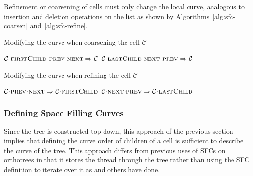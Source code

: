 \documentclass[twoside]{IIBproject}
\newcommand{\acc}{{\mkern 0.5mu\cdot\mkern 0.5mu}}
\numberwithin{figure}{section}
\begin{document}
            Refinement or coarsening of cells must only change the local curve, analogous to insertion and deletion operations on the list as shown by Algorithms~\ref{alg:sfc-coarsen} and~\ref{alg:sfc-refine}.

            \begin{algorithm}[H]
                \caption{Modifying the curve when coarsening the cell $\mathcal{C}$}
                \label{alg:sfc-coarsen}

                \begin{algorithmic}
                    \State $\mathcal{C}\acc\textproc{firstChild}\acc\textproc{prev}\acc\textproc{next} \Rightarrow \mathcal{C}$
                    \State $\mathcal{C}\acc\textproc{lastChild}\acc\textproc{next}\acc\textproc{prev} \Rightarrow \mathcal{C}$
                \end{algorithmic}
            \end{algorithm}

            \begin{algorithm}[H]
                \caption{Modifying the curve when refining the cell $\mathcal{C}$}
                \label{alg:sfc-refine}

                \begin{algorithmic}
                    \Statex
                    \State $\mathcal{C}\acc\textproc{prev}\acc\textproc{next} \Rightarrow \mathcal{C}\acc\textproc{firstChild}$
                    \State $\mathcal{C}\acc\textproc{next}\acc\textproc{prev} \Rightarrow \mathcal{C}\acc\textproc{lastChild}$
                \end{algorithmic}
            \end{algorithm}


        \subsubsection{Defining Space Filling Curves} %
            \label{sec:tftt-sfc}

            Since the tree is constructed top down, this approach of the previous section implies that defining the curve order of children of a cell is sufficient to describe the curve of the tree. This approach differs from previous uses of SFCs on orthotrees in that it stores the thread through the tree rather than using the SFC definition to iterate over it as \cite{bader2013} and others have done.
\end{document}

